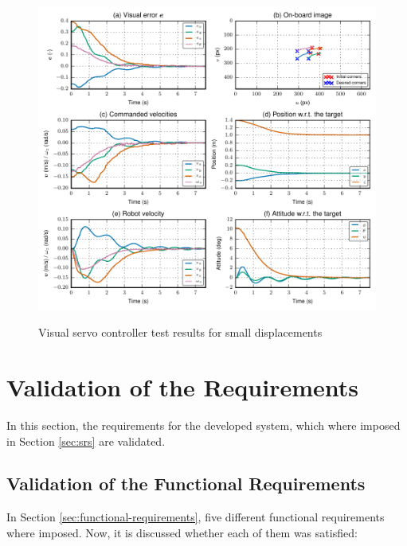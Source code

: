 \begin{figure}[!htb]
	\caption{Visual servo controller test results for small displacements}
	\centering
	\includegraphics[width=\textwidth]{content/chapter_06/images/exp_017_plot.pdf}
	\label{fig:small-displacements}
\end{figure}

\section{Validation of the Requirements}
\label{sec:requirements-validation}

In this section, the requirements for the developed system, which where imposed in Section \ref{sec:srs} are validated.

\subsection{Validation of the Functional Requirements}
\label{sec:functional-requirements-validation}

In Section \ref{sec:functional-requirements}, five different functional requirements where imposed. Now, it is discussed whether each of them was satisfied:

